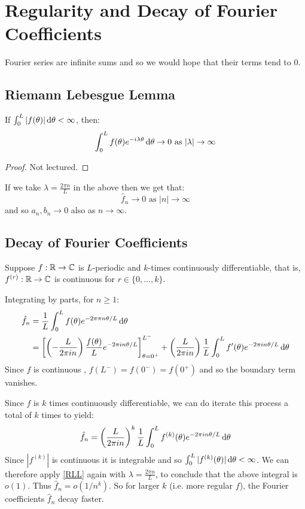 \documentclass[../main.tex]{subfiles}
\begin{document}
\section{Regularity and Decay of Fourier Coefficients}
Fourier series are infinite sums and so we would hope that their terms tend to 0.
\subsection{Riemann Lebesgue Lemma}
\nonexaminable
\begin{theorem}
  If $\int_{0}^{L} |f(\theta)| \d{\theta} < \infty$, then: \label{RLL}
  \[
    \int_{0}^{L} f(\theta) e^{- i \lambda \theta} \d{\theta} \to 0 \text{ as } |\lambda| \to \infty
  \]
\end{theorem}
\begin{proof}
  Not lectured.
\end{proof}
If we take $\lambda = \frac{2 \pi n}{L}$ in the above then we get that:
\[
  \hat{f}_n \to 0 \text{ as } |n| \to \infty
\]
and so $a_n, b_n \to 0$ also as $n \to \infty$.
\subsection{Decay of Fourier Coefficients}
Suppose $f: \mathbb{R} \to \mathbb{C}$ is $L$-periodic and $k$-times continuously differentiable, that is, $f^{(r)}: \mathbb{R} \to \mathbb{C}$ is continuous for $r \in \{0, \ldots, k\}$.

Integrating by parts, for $n \geq 1$:
\begin{align*}
  \hat{f}_n &= \frac{1}{L} \int_{0}^{L} f(\theta) e^{-2 \pi \pi n \theta/L} \d{\theta} \\
            &= \eval{\left(-\frac{L}{2\pi i n}\right) \frac{f(\theta)}{L} e^{-2 \pi i n \theta/L}}{\theta = 0^{+}}{L^{-}} + \left(\frac{L}{2 \pi i n}\right) \frac{1}{L} \int_{0}^{L} f'(\theta) e^{-2 \pi i n \theta / L} \d{\theta}
\end{align*}
Since $f$ is continuous , $f(L^{-}) = f(0^{-}) = f(0^{+})$ and so the boundary term vanishes.

Since $f$ is $k$ times continuously differentiable, we can do iterate this process a total of $k$ times to yield:
\[
  \hat{f}_n = \left(\frac{L}{2\pi i n}\right)^{k} \frac{1}{L} \int_{0}^{L} f^{(k)}(\theta) e^{-2 \pi i n \theta / L} \d{\theta}
\]
Since $|f^{(k)}|$ is continuous it is integrable and so $\int_{0}^{L} |f^{(k)}(\theta)| \d{\theta} < \infty$.
We can therefore apply \cref{RLL} again with $\lambda = \frac{2 \pi n}{L}$, to conclude that the above integral is $o(1)$.
Thus $\hat{f}_n = o(1/n^k)$.
So for larger $k$ (i.e. more regular $f$), the Fourier coefficients $\hat{f}_n$ decay faster.
\end{document}
